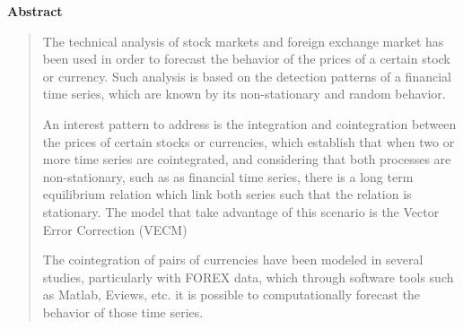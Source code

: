 \vspace*{2cm}
\thispagestyle{empty}
{\bfseries \Huge Abstract }
\vspace{1.5cm}

\begin{quotation}
The technical analysis of stock markets and foreign exchange market has been
used in order to forecast the behavior of the prices of a certain stock
or currency. Such analysis is based on the detection patterns of
a financial time series, which are known by its non-stationary and random
behavior.


An interest pattern to address is the integration and cointegration between the
prices of certain stocks or currencies, which establish that when two or more
time series are cointegrated, and considering that both processes are
non-stationary, such as as financial time series, there is a long term
equilibrium relation which link both series such that the relation is
stationary.  The model that take advantage of this scenario is the Vector Error
Correction (VECM)


The cointegration of pairs of currencies have been modeled in several studies,
particularly with FOREX data, which through software tools such as Matlab,
Eviews, etc.  it is possible to computationally forecast the behavior of those
time series.



\end{quotation}

